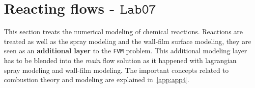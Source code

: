 
\section{Reacting flows - $\mathtt{Lab07}$} \label{sec:lab07}
    
    \renewcommand{\thepage}{\arabic{page}}
    \setcounter{page}{\thelastPage}
    
    This section treats the numerical modeling of chemical reactions. Reactions are treated as well as the spray modeling and the wall-film surface modeling, they are seen as an \textbf{additional layer} to the \verb|FVM| problem. This additional modeling layer has to be blended into the \textit{main} flow solution as it happened with lagrangian spray modeling and wall-film modeling.
The important concepts related to combustion theory and modeling are explained in~\ref{app:app4}.
    

